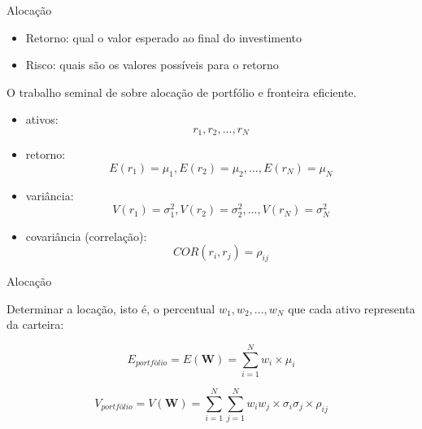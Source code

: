 \documentclass{beamer}
\begin{document}
\begin{frame}{Alocação}

\begin{itemize}
\item Retorno: qual o valor esperado ao final do investimento
\item Risco:   quais são os valores possíveis para o retorno
\end{itemize}

O trabalho seminal de \cite{Markowitz1952} sobre alocação de portfólio e fronteira eficiente.



\end{frame}

\begin{frame}{\cite{Markowitz1952}}


\begin{itemize}
\item ativos: $$r_1,r_2,...,r_N$$
\item retorno: $$E(r_1)=\mu_1,E(r_2)=\mu_2,...,E(r_N)=\mu_N$$
\item variância: $$V(r_1)=\sigma^2_1,V(r_2)=\sigma^2_2,...,V(r_N)=\sigma^2_N$$
\item covariância (correlação): $$COR(r_i,r_j) = \rho_{ij}$$
\end{itemize}



\end{frame}

\begin{frame}{Alocação}

Determinar a locação, isto é, o percentual $w_1,w_2,...,w_N$ que cada ativo representa da carteira:

  
\begin{equation}
E_{portfólio} = E(\mathbf{ W})=  \sum_{i=1}^N w_i \times \mu_i
\end{equation}


\begin{equation}
V_{portfólio} =V(\mathbf{ W})= \sum_{i=1}^N\sum_{j=1}^N w_i w_j \times \sigma_i \sigma_j \times  \rho_{ij}
\end{equation}

\end{frame}
\end{document}
